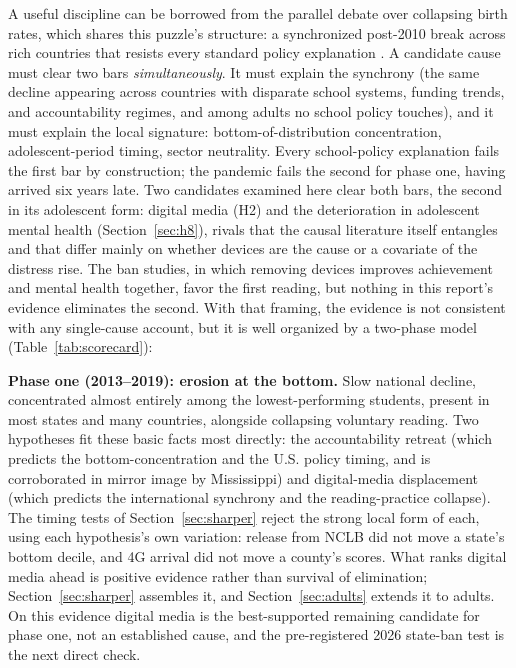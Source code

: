 \documentclass[11pt]{article}
\begin{document}
A useful discipline can be borrowed from the parallel debate over collapsing birth rates, which shares this puzzle's structure: a synchronized post-2010 break across rich countries that resists every standard policy explanation \citep{kearneylevine2022,evans2024}. A candidate cause must clear two bars \emph{simultaneously}. It must explain the synchrony (the same decline appearing across countries with disparate school systems, funding trends, and accountability regimes, and among adults no school policy touches), and it must explain the local signature: bottom-of-distribution concentration, adolescent-period timing, sector neutrality. Every school-policy explanation fails the first bar by construction; the pandemic fails the second for phase one, having arrived six years late. Two candidates examined here clear both bars, the second in its adolescent form: digital media (H2) and the deterioration in adolescent mental health (Section~\ref{sec:h8}), rivals that the causal literature itself entangles and that differ mainly on whether devices are the cause or a covariate of the distress rise. The ban studies, in which removing devices improves achievement and mental health together, favor the first reading, but nothing in this report's evidence eliminates the second. With that framing, the evidence is not consistent with any single-cause account, but it is well organized by a two-phase model (Table~\ref{tab:scorecard}):

\textbf{Phase one (2013--2019): erosion at the bottom.} Slow national decline, concentrated almost entirely among the lowest-performing students, present in most states and many countries, alongside collapsing voluntary reading. Two hypotheses fit these basic facts most directly: the accountability retreat (which predicts the bottom-concentration and the U.S. policy timing, and is corroborated in mirror image by Mississippi) and digital-media displacement (which predicts the international synchrony and the reading-practice collapse). The timing tests of Section~\ref{sec:sharper} reject the strong local form of each, using each hypothesis's own variation: release from NCLB did not move a state's bottom decile, and 4G arrival did not move a county's scores. What ranks digital media ahead is positive evidence rather than survival of elimination; Section~\ref{sec:sharper} assembles it, and Section~\ref{sec:adults} extends it to adults. On this evidence digital media is the best-supported remaining candidate for phase one, not an established cause, and the pre-registered 2026 state-ban test is the next direct check.
\end{document}
